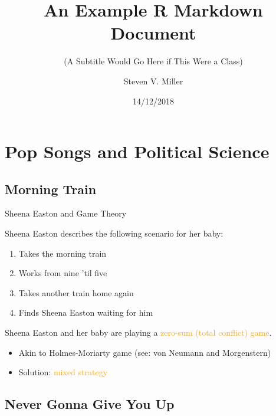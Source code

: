 \documentclass[10pt,ignorenonframetext,]{beamer}
\title{An Example R Markdown Document}
\subtitle{(A Subtitle Would Go Here if This Were a Class)}
\author{Steven V. Miller}
\date{14/12/2018}
\providecommand{\tightlist}{%
  \setlength{\itemsep}{0pt}\setlength{\parskip}{0pt}}
\begin{document}
\frame{\titlepage}

\hypertarget{pop-songs-and-political-science}{%
\section{Pop Songs and Political
Science}\label{pop-songs-and-political-science}}

\hypertarget{morning-train}{%
\subsection{Morning Train}\label{morning-train}}

\begin{frame}{Sheena Easton and Game Theory}
\protect\hypertarget{sheena-easton-and-game-theory}{}

Sheena Easton describes the following scenario for her baby:

\begin{enumerate}
\tightlist
\item
  Takes the morning train
\item
  Works from nine 'til five
\item
  Takes another train home again
\item
  Finds Sheena Easton waiting for him
\end{enumerate}

\bigskip Sheena Easton and her baby are playing a
\textcolor{orange}{zero-sum (total conflict) game}.

\begin{itemize}
\tightlist
\item
  Akin to Holmes-Moriarty game (see: von Neumann and Morgenstern)
\item
  Solution: \textcolor{orange}{mixed strategy}
\end{itemize}

\end{frame}

\hypertarget{never-gonna-give-you-up}{%
\subsection{Never Gonna Give You Up}\label{never-gonna-give-you-up}}
\end{document}
